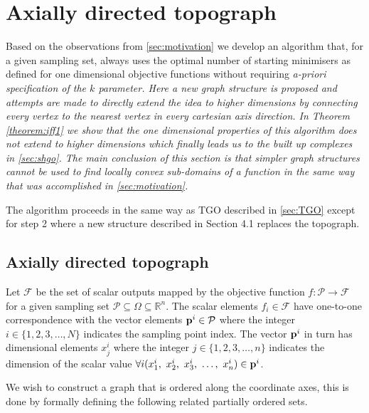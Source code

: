 \section{Axially directed topograph}  \label{sec:atgo}
Based on the observations from \autoref{sec:motivation} we develop an algorithm that, for a given sampling set, always uses the optimal number of starting minimisers as defined for one dimensional objective functions without requiring \it{a-priori} \normalfont specification of the $k$ parameter. Here a new graph structure is proposed and attempts are made to directly extend the idea to higher dimensions by connecting every vertex to the nearest vertex in every cartesian axis direction. In Theorem \ref{theorem:iff1} we show that the one dimensional properties of this algorithm does not extend to higher dimensions which finally leads us to the built up complexes in \autoref{sec:shgo}. The main conclusion of this section is that simpler graph structures cannot be used to find locally convex sub-domains of a function in the same way that was accomplished in \autoref{sec:motivation}.

The algorithm proceeds in the same way as TGO described in \autoref{sec:TGO} except for step 2 where a new structure described in Section 4.1 replaces the topograph. 


\subsection{Axially directed topograph}
Let $\mathcal{F}$ be the set of scalar outputs mapped by the objective function $f:\mathcal{P} \rightarrow \mathcal{F}$ for a given sampling set $\mathcal{P} \subseteq \Omega \subseteq \mathbb{R}^n$. The scalar elements $f_i \in \mathcal{F}$ have one-to-one correspondence with the vector elements $\bold{p}^i \in \mathcal{P}$ where the integer $i \in \{1, 2, 3, \dots, N\}$ indicates the sampling point index. The vector $\bold{p}^i$ in turn has dimensional elements $x_j^{i}$ where the integer $j \in \{1, 2, 3, \dots, n\}$ indicates the dimension of the scalar value  $\forall i (x^{i}_1,~x^{i}_2,~x^{i}_3,~\dots,~x^{i}_n) \in \bold{p}^i$. 

We wish to construct a graph that is ordered along the coordinate axes, this is done by formally defining the following related partially ordered sets.

